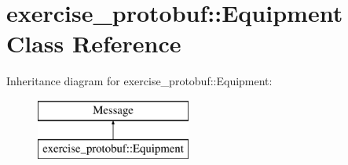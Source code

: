 \hypertarget{classexercise__protobuf_1_1_equipment}{}\section{exercise\+\_\+protobuf\+:\+:Equipment Class Reference}
\label{classexercise__protobuf_1_1_equipment}
Inheritance diagram for exercise\+\_\+protobuf\+:\+:Equipment\+:\begin{figure}[H]
\begin{center}
\leavevmode
\includegraphics[height=2.000000cm]{classexercise__protobuf_1_1_equipment}
\end{center}
\end{figure}
